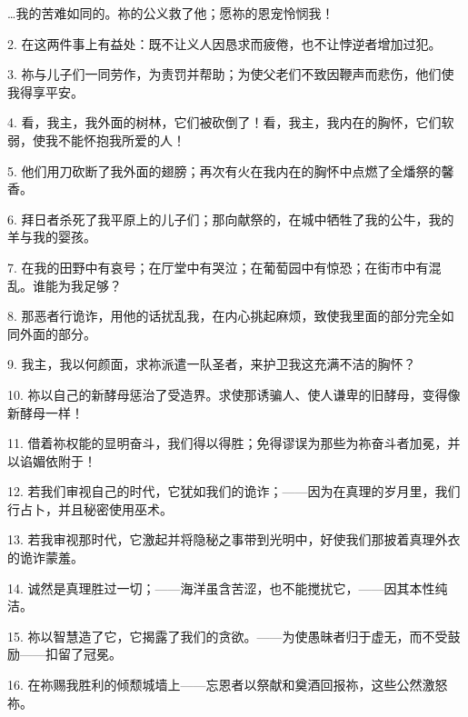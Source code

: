 …我的苦难如同的。祢的公义救了他；愿祢的恩宠怜悯我！\par

2. 在这两件事上有益处：既不让义人因恳求而疲倦，也不让悖逆者增加过犯。\par

3. 祢与儿子们一同劳作，为责罚并帮助；为使父老们不致因鞭声而悲伤，他们使我得享平安。\par

4. 看，我主，我外面的树林，它们被砍倒了！看，我主，我内在的胸怀，它们软弱，使我不能怀抱我所爱的人！\par

5. 他们用刀砍断了我外面的翅膀；再次有火在我内在的胸怀中点燃了全燔祭的馨香。\par

6. 拜日者杀死了我平原上的儿子们；那向献祭的，在城中牺牲了我的公牛，我的羊与我的婴孩。\par

7. 在我的田野中有哀号；在厅堂中有哭泣；在葡萄园中有惊恐；在街市中有混乱。谁能为我足够？\par

8. 那恶者行诡诈，用他的话扰乱我，在内心挑起麻烦，致使我里面的部分完全如同外面的部分。\par

9. 我主，我以何颜面，求祢派遣一队圣者，来护卫我这充满不洁的胸怀？\par

10. 祢以自己的新酵母惩治了受造界。求使那诱骗人、使人谦卑的旧酵母，变得像新酵母一样！\par

11. 借着祢权能的显明奋斗，我们得以得胜；免得谬误为那些为祢奋斗者加冕，并以谄媚依附于！\par

12. 若我们审视自己的时代，它犹如我们的诡诈；——因为在真理的岁月里，我们行占卜，并且秘密使用巫术。\par

13. 若我审视那时代，它激起并将隐秘之事带到光明中，好使我们那披着真理外衣的诡诈蒙羞。\par

14. 诚然是真理胜过一切；——海洋虽含苦涩，也不能搅扰它，——因其本性纯洁。\par

15. 祢以智慧造了它，它揭露了我们的贪欲。——为使愚昧者归于虚无，而不受鼓励——扣留了冠冕。\par

16. 在祢赐我胜利的倾颓城墙上——忘恩者以祭献和奠酒回报祢，这些公然激怒祢。\par

